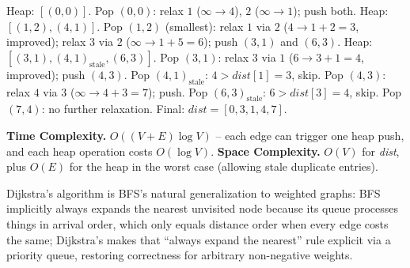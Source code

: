 Heap: $[(0,0)]$. Pop $(0,0)$: relax $1$ ($\infty\to4$), $2$
($\infty\to1$); push both. Heap: $[(1,2),(4,1)]$. Pop $(1,2)$
(smallest): relax $1$ via $2$ ($4\to1+2=3$, improved); relax $3$ via
$2$ ($\infty\to1+5=6$); push $(3,1)$ and $(6,3)$. Heap:
$[(3,1),(4,1)_{\text{stale}},(6,3)]$. Pop $(3,1)$: relax $3$ via $1$
($6\to3+1=4$, improved); push $(4,3)$. Pop $(4,1)_{\text{stale}}$:
$4 > \textit{dist}[1]=3$, skip. Pop $(4,3)$: relax $4$ via $3$
($\infty\to4+3=7$); push. Pop $(6,3)_{\text{stale}}$: $6 >
\textit{dist}[3]=4$, skip. Pop $(7,4)$: no further relaxation. Final:
$\textit{dist}=[0,3,1,4,7]$.

\begin{complexitybox}
\textbf{Time Complexity.} $O((V+E)\log V)$ -- each edge can trigger one
heap push, and each heap operation costs $O(\log V)$.
\textbf{Space Complexity.} $O(V)$ for \textit{dist}, plus $O(E)$ for
the heap in the worst case (allowing stale duplicate entries).
\end{complexitybox}

\begin{takeawaybox}
Dijkstra's algorithm is BFS's natural generalization to weighted
graphs: BFS implicitly always expands the nearest unvisited node
because its queue processes things in arrival order, which only equals
distance order when every edge costs the same; Dijkstra's makes that
``always expand the nearest'' rule explicit via a priority queue,
restoring correctness for arbitrary non-negative weights.
\end{takeawaybox}
